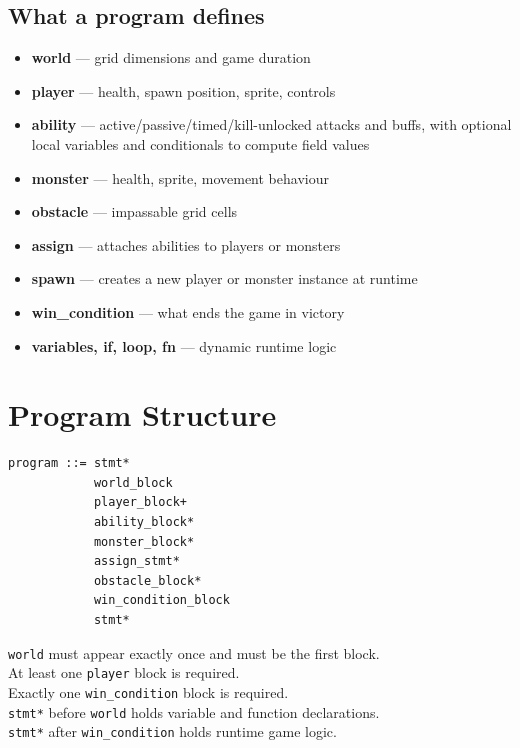 \documentclass[12pt,a4paper]{article}
\begin{document}
\subsection*{What a program defines}
\begin{itemize}[noitemsep]
  \item \textbf{world} --- grid dimensions and game duration
  \item \textbf{player} --- health, spawn position, sprite, controls
  \item \textbf{ability} --- active/passive/timed/kill-unlocked attacks and buffs,
        with optional local variables and conditionals to compute field values
  \item \textbf{monster} --- health, sprite, movement behaviour
  \item \textbf{obstacle} --- impassable grid cells
  \item \textbf{assign} --- attaches abilities to players or monsters
  \item \textbf{spawn} --- creates a new player or monster instance at runtime
  \item \textbf{win\_condition} --- what ends the game in victory
  \item \textbf{variables, if, loop, fn} --- dynamic runtime logic
\end{itemize}

\section{Program Structure}

\begin{lstlisting}[style=bnf]
program ::= stmt*
            world_block
            player_block+
            ability_block*
            monster_block*
            assign_stmt*
            obstacle_block*
            win_condition_block
            stmt*
\end{lstlisting}

\begin{cbox}
\texttt{world} must appear exactly once and must be the first block.\\
At least one \texttt{player} block is required.\\
Exactly one \texttt{win\_condition} block is required.\\
\texttt{stmt*} before \texttt{world} holds variable and function declarations.\\
\texttt{stmt*} after \texttt{win\_condition} holds runtime game logic.
\end{cbox}
\end{document}
